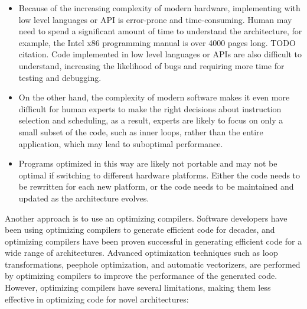 \begin{itemize}
%
\item Because of the increasing complexity of modern hardware,
implementing with low level languages or API is error-prone and
time-consuming. Human may need to spend a significant amount of time
to understand the architecture, for example, the Intel x86 programming
manual is over 4000 pages long. TODO citation. Code implemented in low
level languages or APIs are also difficult to understand, increasing
the likelihood of bugs and requiring more time for testing and
debugging.

\item On the other hand, the complexity of modern software makes it even
more difficult for human experts to make the right decisions about
instruction selection and scheduling, as a result, experts are likely
to focus on only a small subset of the code, such as inner loops,
rather than the entire application, which may lead to suboptimal
performance.

\item Programs optimized in this way are likely not portable and
may not be optimal if switching to different hardware platforms.
%
Either the code needs to be rewritten for each new platform, or the
code needs to be maintained and updated as the architecture evolves.

\end{itemize}


Another approach is to use an optimizing compilers.
%
Software developers have been using optimizing compilers to generate
efficient code for decades, and optimizing compilers have been proven
successful in generating efficient code for a wide range of
architectures.
%
Advanced optimization techniques such as loop transformations,
peephole optimization, and automatic vectorizers, are performed by
optimizing compilers to improve the performance of the generated code.
%
However, optimizing compilers have several limitations, making them
less effective in optimizing code for novel architectures:

